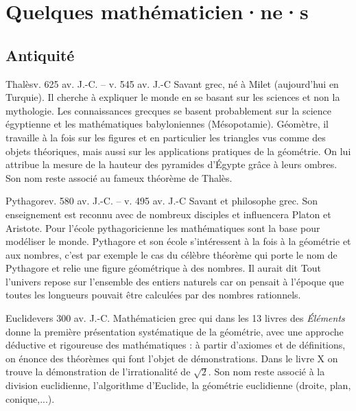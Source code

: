 \documentclass[10pt,class=article,crop=false]{standalone}
\begin{document}
\section{Quelques mathématicien·ne·s}


\begin{multicols}{2}

\subsection{Antiquité}

\begin{biographie}{Thalès}{v. 625 av. J.-C. -- v. 545 av. J.-C}
Savant grec, né à Milet (aujourd'hui en Turquie).  Il cherche à expliquer le monde en se basant sur les sciences et non la mythologie. 
Les connaissances grecques se basent probablement sur la science égyptienne et les mathématiques babyloniennes (Mésopotamie).
Géomètre, il travaille à la fois sur les figures et en particulier les triangles vus comme des objets théoriques, mais aussi sur les applications pratiques de la géométrie. On lui attribue la mesure de la hauteur des pyramides d'Égypte grâce à leurs ombres. Son nom reste associé au fameux théorème de Thalès.
\end{biographie}


\begin{biographie}{Pythagore}{v. 580 av. J.-C. -- v. 495 av. J.-C}
Savant et philosophe grec. Son enseignement est reconnu avec de nombreux disciples et influencera Platon et Aristote. Pour l'école pythagoricienne les mathématiques sont la base pour modéliser le monde. Pythagore et son école s'intéressent à la fois à la géométrie et aux nombres, c'est par exemple le cas du célèbre théorème qui porte le nom de Pythagore et relie une figure géométrique à des nombres. Il aurait dit \og{}Tout l'univers repose sur l'ensemble des entiers naturels\fg{} car on pensait à l'époque que toutes les longueurs pouvait être calculées par des nombres rationnels.
\end{biographie}


\begin{biographie}{Euclide}{vers 300 av. J.-C.}
Mathématicien grec qui dans les 13 livres des \emph{Éléments} donne la première présentation systématique de la géométrie, avec une approche déductive et rigoureuse des mathématiques : à partir d'axiomes et de définitions, on énonce des théorèmes qui font l'objet de démonstrations. Dans le livre X on trouve la démonstration de l'irrationalité de $\sqrt2$.
Son nom reste associé à la division euclidienne, l'algorithme d'Euclide, la géométrie euclidienne (droite, plan, conique,...).
\end{biographie}


\end{multicols}
\end{document}
